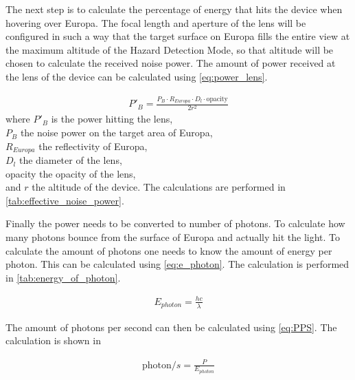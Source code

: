 

The next step is to calculate the percentage of energy that hits the device when hovering over Europa. The focal length and aperture of the lens will be configured in such a way that the target surface on Europa fills the entire view at the maximum altitude of the Hazard Detection Mode, so that altitude will be chosen to calculate the received noise power. The amount of power received at the lens of the device can be calculated using \cref{eq:power_lens}.

\begin{align}\label{eq:power_lens}
P'_B = \frac{P_B\cdot R_{Europa}\cdot D_l\cdot \text{opacity}}{2r^2}
\end{align}
where $P'_B$ is the power hitting the lens, \\
$P_B$ the noise power on the target area of Europa,\\
$R_{Europa}$ the reflectivity of Europa,\\
$D_l$ the diameter of the lens,\\
opacity the opacity of the lens,\\
and $r$ the altitude of the device. The calculations are performed in \cref{tab:effective_noise_power}.



Finally the power needs to be converted to number of photons. To calculate how many photons bounce from the surface of Europa and actually hit the light. To calculate the amount of photons one needs to know the amount of energy per photon. This can be calculated using \cref{eq:e_photon}. The calculation is performed in \cref{tab:energy_of_photon}.

\begin{align}\label{eq:e_photon}
E_{photon} = \frac{hc}{\lambda}
\end{align}

 

The amount of photons per second can then be calculated using \cref{eq:PPS}. The calculation is shown in

\begin{align}\label{eq:PPS}
\text{photon}/s = \frac{P}{E_{photon}}
\end{align}













